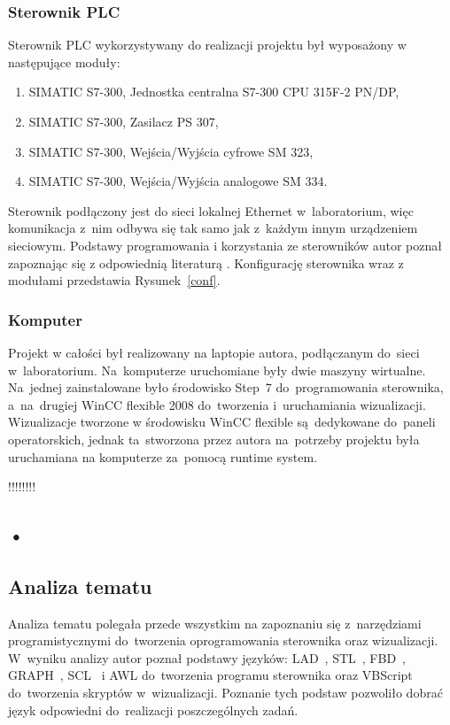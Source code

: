 \subsubsection{Sterownik PLC}
Sterownik PLC wykorzystywany do realizacji projektu był wyposażony w następujące moduły:
\begin{enumerate}
\item SIMATIC S7-300, Jednostka centralna S7-300 CPU 315F-2 PN/DP,
\item SIMATIC S7-300, Zasilacz PS 307,
\item SIMATIC S7-300, Wejścia/Wyjścia cyfrowe SM 323,
\item SIMATIC S7-300, Wejścia/Wyjścia analogowe SM 334.
\end{enumerate}
\indent
\indent Sterownik podłączony jest do sieci lokalnej Ethernet w~laboratorium, więc komunikacja z~nim odbywa się tak samo jak z~każdym innym urządzeniem sieciowym. Podstawy programowania i korzystania ze sterowników autor poznał zapoznając się z odpowiednią literaturą \cite{plc1,plc2,plc4,plc5,plc6}.
Konfigurację sterownika wraz z modułami przedstawia Rysunek~\ref{conf}.
\subsubsection{Komputer}
Projekt w całości był realizowany na laptopie autora, podłączanym do~sieci w~laboratorium. Na~komputerze uruchomiane były dwie maszyny wirtualne. Na~jednej zainstalowane było środowisko Step~7 do~programowania sterownika, a~na~drugiej WinCC flexible 2008 do~tworzenia i~uruchamiania wizualizacji. Wizualizacje tworzone w środowisku WinCC flexible są~dedykowane do~paneli operatorskich, jednak ta~stworzona przez autora na~potrzeby projektu była uruchamiana na komputerze za~pomocą runtime system.

!!!!!!!!
\subsection{•}
\subsection{Analiza tematu}
Analiza tematu polegała przede wszystkim na zapoznaniu się z~narzędziami programistycznymi do~tworzenia oprogramowania sterownika oraz wizualizacji.
W~wyniku analizy autor poznał podstawy języków: LAD~\cite{step1,step2,step3}, STL~\cite{step1,step2,step3}, FBD~\cite{step1,step2,step3}, GRAPH~\cite{step3}, SCL~\cite{scl1,scl2,scl3} i AWL do~tworzenia programu sterownika oraz VBScript do~tworzenia skryptów w~wizualizacji.
Poznanie tych podstaw pozwoliło dobrać język odpowiedni do~realizacji poszczególnych zadań.

